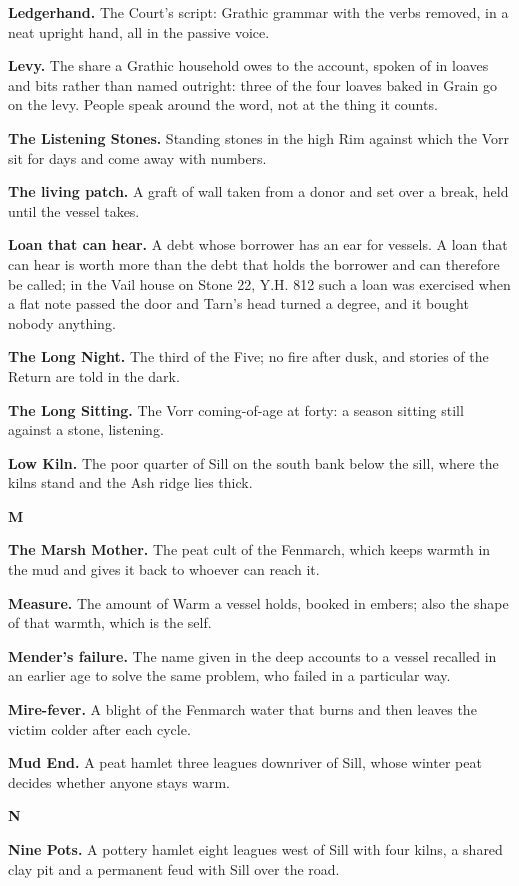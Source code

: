\documentclass{design/chronicle}
\begin{document}
\textbf{Ledgerhand.} The Court’s script: Grathic grammar with the verbs removed, in a neat upright hand, all in the passive voice.

\textbf{Levy.} The share a Grathic household owes to the account, spoken of in loaves and bits rather than named outright: three of the four loaves baked in Grain go on the levy. People speak around the word, not at the thing it counts.

\textbf{The Listening Stones.} Standing stones in the high Rim against which the Vorr sit for days and come away with numbers.

\textbf{The living patch.} A graft of wall taken from a donor and set over a break, held until the vessel takes.

\textbf{Loan that can hear.} A debt whose borrower has an ear for vessels. A loan that can hear is worth more than the debt that holds the borrower and can therefore be called; in the Vail house on Stone 22, Y.H. 812 such a loan was exercised when a flat note passed the door and Tarn’s head turned a degree, and it bought nobody anything.

\textbf{The Long Night.} The third of the Five; no fire after dusk, and stories of the Return are told in the dark.

\textbf{The Long Sitting.} The Vorr coming-of-age at forty: a season sitting still against a stone, listening.

\textbf{Low Kiln.} The poor quarter of Sill on the south bank below the sill, where the kilns stand and the Ash ridge lies thick.

\textbf{M}

\textbf{The Marsh Mother.} The peat cult of the Fenmarch, which keeps warmth in the mud and gives it back to whoever can reach it.

\textbf{Measure.} The amount of Warm a vessel holds, booked in embers; also the shape of that warmth, which is the self.

\textbf{Mender’s failure.} The name given in the deep accounts to a vessel recalled in an earlier age to solve the same problem, who failed in a particular way.

\textbf{Mire-fever.} A blight of the Fenmarch water that burns and then leaves the victim colder after each cycle.

\textbf{Mud End.} A peat hamlet three leagues downriver of Sill, whose winter peat decides whether anyone stays warm.

\textbf{N}

\textbf{Nine Pots.} A pottery hamlet eight leagues west of Sill with four kilns, a shared clay pit and a permanent feud with Sill over the road.
\end{document}
